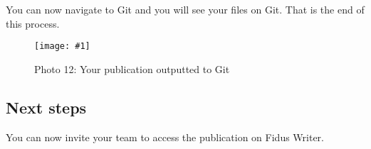 \documentclass{article}
\newlength{\imgwidth}
\newcommand\scaledgraphics[2]{%
                
\settowidth{\imgwidth}{\texttt{[image: \#1]}}%
                
\setlength{\imgwidth}{\minof{\imgwidth}{#2\textwidth}}%
                
\texttt{[image: \#1]}%
                
}
\begin{document}
You can now navigate to Git and you will see your files on Git. That is the end of this process.

\begin{figure}
\scaledgraphics{d80dc5a5-d385-4a3b-a03a-a752ff2686c9.png}{1}
\caption*{Photo 12: Your publication outputted to Git}\label{F54557401}
\end{figure}


\subsection{Next steps}\label{H6619707}



You can now invite your team to access the publication on Fidus Writer.
\end{document}
